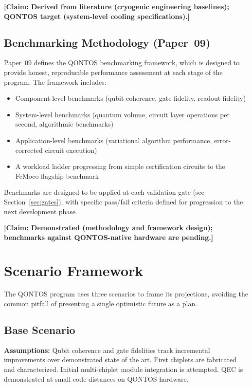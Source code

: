 \documentclass[conference]{IEEEtran}
\begin{document}
\textbf{[Claim: Derived from literature (cryogenic engineering baselines); QONTOS target (system-level cooling specifications).]}

\subsection{Benchmarking Methodology (Paper~09)}

Paper~09 defines the QONTOS benchmarking framework, which is designed to provide honest, reproducible performance assessment at each stage of the program. The framework includes:

\begin{itemize}
\item Component-level benchmarks (qubit coherence, gate fidelity, readout fidelity)
\item System-level benchmarks (quantum volume, circuit layer operations per second, algorithmic benchmarks)
\item Application-level benchmarks (variational algorithm performance, error-corrected circuit execution)
\item A workload ladder progressing from simple certification circuits to the FeMoco flagship benchmark
\end{itemize}

Benchmarks are designed to be applied at each validation gate (see Section~\ref{sec:gates}), with specific pass/fail criteria defined for progression to the next development phase.

\textbf{[Claim: Demonstrated (methodology and framework design); benchmarks against QONTOS-native hardware are pending.]}

\section{Scenario Framework}

The QONTOS program uses three scenarios to frame its projections, avoiding the common pitfall of presenting a single optimistic future as a plan.

\subsection{Base Scenario}

\textbf{Assumptions:} Qubit coherence and gate fidelities track incremental improvements over demonstrated state of the art. First chiplets are fabricated and characterized. Initial multi-chiplet module integration is attempted. QEC is demonstrated at small code distances on QONTOS hardware.
\end{document}
